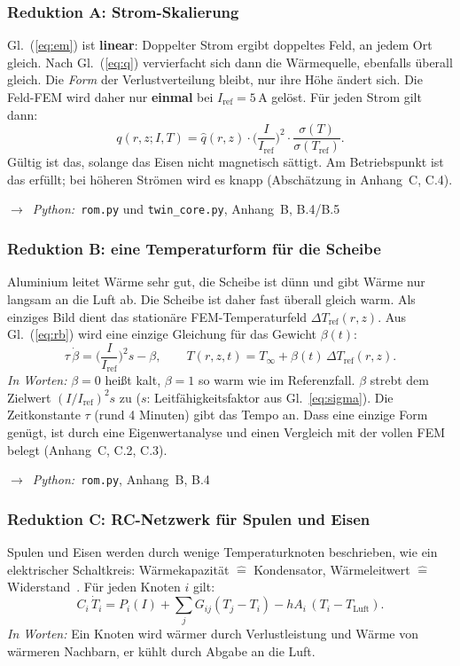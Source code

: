 \documentclass[a4paper, 10pt, conference]{ieeeconf}
\newcommand{\py}[1]{\par{\raggedright\noindent$\rightarrow$~\textit{Python:}~#1\par}\smallskip}
\begin{document}
\subsubsection{Reduktion A: Strom-Skalierung}
Gl.~(\ref{eq:em}) ist \textbf{linear}: Doppelter Strom ergibt doppeltes
Feld, an jedem Ort gleich. Nach Gl.~(\ref{eq:q}) vervierfacht sich dann die
Wärmequelle, ebenfalls überall gleich. Die \textit{Form} der
Verlustverteilung bleibt, nur ihre Höhe ändert sich. Die Feld-FEM wird daher
nur \textbf{einmal} bei $I_{\mathrm{ref}}=5$\,A gelöst. Für jeden Strom gilt
dann:
\begin{equation}
q(r,z;I,T)=\hat q(r,z)\cdot\Big(\frac{I}{I_{\mathrm{ref}}}\Big)^{2}\cdot
\frac{\sigma(T)}{\sigma(T_{\mathrm{ref}})} .
\label{eq:scale}
\end{equation}
Gültig ist das, solange das Eisen nicht magnetisch sättigt. Am Betriebspunkt
ist das erfüllt; bei höheren Strömen wird es knapp (Abschätzung in
Anhang~C, C.4).
\py{\texttt{rom.py} und \texttt{twin\_core.py}, Anhang~B, B.4/B.5}

\subsubsection{Reduktion B: eine Temperaturform für die Scheibe}
Aluminium leitet Wärme sehr gut, die Scheibe ist dünn und gibt Wärme nur
langsam an die Luft ab. Die Scheibe ist daher fast überall gleich warm. Als
einziges \glqq Bild\grqq{} dient das stationäre FEM-Temperaturfeld
$\Delta T_{\mathrm{ref}}(r,z)$. Aus Gl.~(\ref{eq:rb}) wird eine einzige
Gleichung für das Gewicht $\beta(t)$:
\begin{equation}
\tau\,\dot\beta=\Big(\frac{I}{I_{\mathrm{ref}}}\Big)^{2}s-\beta,\qquad
T(r,z,t)=T_\infty+\beta(t)\,\Delta T_{\mathrm{ref}}(r,z).
\label{eq:beta}
\end{equation}
\textit{In Worten:} $\beta=0$ heißt kalt, $\beta=1$ so warm wie im
Referenzfall. $\beta$ strebt dem Zielwert $(I/I_{\mathrm{ref}})^2 s$ zu ($s$:
Leitfähigkeitsfaktor aus Gl.~\ref{eq:sigma}). Die Zeitkonstante $\tau$ (rund
4 Minuten) gibt das Tempo an. Dass eine einzige Form genügt, ist durch eine
Eigenwertanalyse und einen Vergleich mit der vollen FEM belegt
(Anhang~C, C.2, C.3).
\py{\texttt{rom.py}, Anhang~B, B.4}

\subsubsection{Reduktion C: RC-Netzwerk für Spulen und Eisen}
Spulen und Eisen werden durch wenige Temperaturknoten beschrieben, wie ein
elektrischer Schaltkreis: Wärmekapazität $\widehat{=}$ Kondensator,
Wärmeleitwert $\widehat{=}$ Widerstand~\cite{wallscheid2021thermal}. Für
jeden Knoten $i$ gilt:
\begin{equation}
C_i\,\dot T_i=P_i(I)+\sum_j G_{ij}(T_j-T_i)-hA_i\,(T_i-T_{\mathrm{Luft}}).
\label{eq:rc}
\end{equation}
\textit{In Worten:} Ein Knoten wird wärmer durch Verlustleistung und Wärme
von wärmeren Nachbarn, er kühlt durch Abgabe an die Luft.
\end{document}
